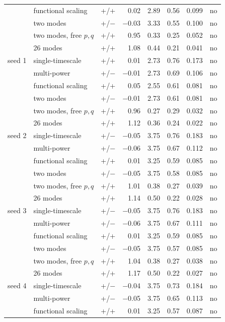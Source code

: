 \begin{longtable}{llcrrrrc}
 & functional scaling & +/+ & 0.02 & 2.89 & 0.56 & 0.099 & no\\
 & two modes & +/$-$ & $-$0.03 & 3.33 & 0.55 & 0.100 & no\\
 & two modes, free $p,q$ & +/+ & 0.95 & 0.33 & 0.25 & 0.052 & no\\
 & 26 modes & +/+ & 1.08 & 0.44 & 0.21 & 0.041 & no\\
\addlinespace
seed 1 & single-timescale & +/+ & 0.01 & 2.73 & 0.76 & 0.173 & no\\
 & multi-power & +/$-$ & $-$0.01 & 2.73 & 0.69 & 0.106 & no\\
 & functional scaling & +/+ & 0.05 & 2.55 & 0.61 & 0.081 & no\\
 & two modes & +/$-$ & $-$0.01 & 2.73 & 0.61 & 0.081 & no\\
 & two modes, free $p,q$ & +/+ & 0.96 & 0.27 & 0.29 & 0.032 & no\\
 & 26 modes & +/+ & 1.12 & 0.36 & 0.24 & 0.022 & no\\
\addlinespace
seed 2 & single-timescale & +/$-$ & $-$0.05 & 3.75 & 0.76 & 0.183 & no\\
 & multi-power & +/$-$ & $-$0.06 & 3.75 & 0.67 & 0.112 & no\\
 & functional scaling & +/+ & 0.01 & 3.25 & 0.59 & 0.085 & no\\
 & two modes & +/$-$ & $-$0.05 & 3.75 & 0.58 & 0.085 & no\\
 & two modes, free $p,q$ & +/+ & 1.01 & 0.38 & 0.27 & 0.039 & no\\
 & 26 modes & +/+ & 1.14 & 0.50 & 0.22 & 0.028 & no\\
\addlinespace
seed 3 & single-timescale & +/$-$ & $-$0.05 & 3.75 & 0.76 & 0.183 & no\\
 & multi-power & +/$-$ & $-$0.06 & 3.75 & 0.67 & 0.111 & no\\
 & functional scaling & +/+ & 0.01 & 3.25 & 0.59 & 0.085 & no\\
 & two modes & +/$-$ & $-$0.05 & 3.75 & 0.57 & 0.085 & no\\
 & two modes, free $p,q$ & +/+ & 1.04 & 0.38 & 0.27 & 0.038 & no\\
 & 26 modes & +/+ & 1.17 & 0.50 & 0.22 & 0.027 & no\\
\addlinespace
seed 4 & single-timescale & +/$-$ & $-$0.04 & 3.75 & 0.73 & 0.184 & no\\
 & multi-power & +/$-$ & $-$0.05 & 3.75 & 0.65 & 0.113 & no\\
 & functional scaling & +/+ & 0.01 & 3.25 & 0.57 & 0.087 & no\\

\end{longtable}
